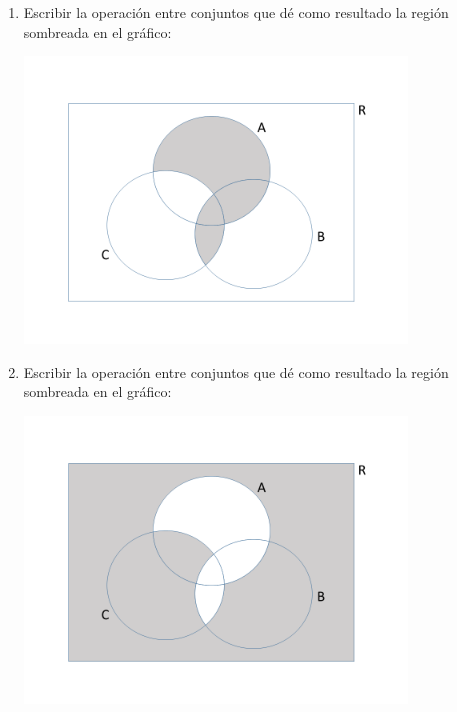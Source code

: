 \documentclass[12pt]{article}
\begin{document}
\begin{enumerate}
\item  
Escribir la operación entre conjuntos que dé como resultado la  región sombreada en el gráfico:
\begin{center} 
\includegraphics[width= 0.8\textwidth]{ej1_9.png} 
\end{center}

\item  
Escribir la operación entre conjuntos que dé como resultado la  región sombreada en el gráfico:
\begin{center} 
\includegraphics[width= 0.8\textwidth]{ej1_10.png} 
\end{center}
\end{enumerate}
\end{document}
